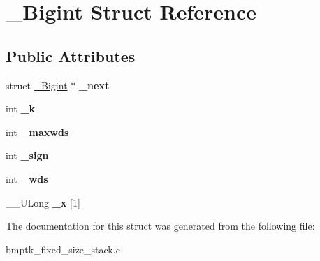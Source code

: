\hypertarget{struct___bigint}{}\section{\+\_\+\+Bigint Struct Reference}
\label{struct___bigint}
\subsection*{Public Attributes}
\begin{DoxyCompactItemize}
\item 
struct \hyperlink{struct___bigint}{\+\_\+\+Bigint} $\ast$ {\bfseries \+\_\+next}\hypertarget{struct___bigint_a2c373d43b666bd785a1b87a925628073}{}\label{struct___bigint_a2c373d43b666bd785a1b87a925628073}

\item 
int {\bfseries \+\_\+k}\hypertarget{struct___bigint_aef0f85f91b3ff29d567194569730a092}{}\label{struct___bigint_aef0f85f91b3ff29d567194569730a092}

\item 
int {\bfseries \+\_\+maxwds}\hypertarget{struct___bigint_a8fc4757e8735217f5e10901a26f08499}{}\label{struct___bigint_a8fc4757e8735217f5e10901a26f08499}

\item 
int {\bfseries \+\_\+sign}\hypertarget{struct___bigint_ab1ce6dc1aafcbdeaae4f4f97fc285b24}{}\label{struct___bigint_ab1ce6dc1aafcbdeaae4f4f97fc285b24}

\item 
int {\bfseries \+\_\+wds}\hypertarget{struct___bigint_a5f1e4b62f5958cc2bf3440626703bdd8}{}\label{struct___bigint_a5f1e4b62f5958cc2bf3440626703bdd8}

\item 
\+\_\+\+\_\+\+U\+Long {\bfseries \+\_\+x} \mbox{[}1\mbox{]}\hypertarget{struct___bigint_afb8f3258779ada3c61d747cfb831bdbf}{}\label{struct___bigint_afb8f3258779ada3c61d747cfb831bdbf}

\end{DoxyCompactItemize}


The documentation for this struct was generated from the following file\+:\begin{DoxyCompactItemize}
\item 
bmptk\+\_\+fixed\+\_\+size\+\_\+stack.\+c\end{DoxyCompactItemize}
